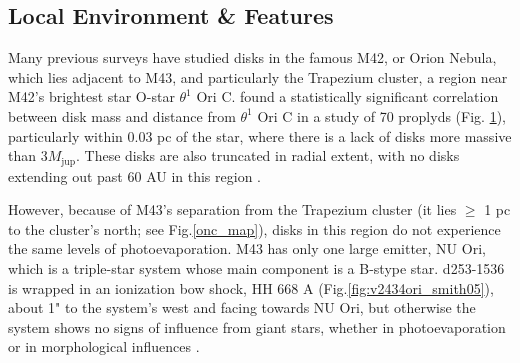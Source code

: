 \subsection{Local Environment \& Features}
Many previous surveys have studied disks in the famous M42, or Orion Nebula, which lies adjacent to M43, and particularly the Trapezium cluster, a region near M42's brightest star O-star $\theta^1$ Ori C. \citet{Mann2014} found a statistically significant correlation between disk mass and distance from $\theta^1$ Ori C in a study of 70 proplyds (Fig. \ref{fig:onc_disk_relations}), particularly within 0.03 pc of the star, where there is a lack of disks more massive than $3 M_\text{jup}$. These disks are also truncated in radial extent, with no disks extending out past 60 AU in this region \citep{Eisner2018}.


\begin{figure}[htp]
  \hspace*{\fill}%
  \hfill%
  \hspace*{\fill}%
  \label{fig:onc_disk_relations}
\end{figure}


However, because of M43's separation from the Trapezium cluster (it lies $\geq$ 1 pc to the cluster's north; see Fig.\ref{onc_map}), disks in this region do not experience the same levels of photoevaporation. M43 has only one large emitter, NU Ori, which is a triple-star system whose main component is a B-stype star. d253-1536 is wrapped in an ionization bow shock, HH 668 A (Fig.\ref{fig:v2434ori_smith05}), about 1" to the system's west and facing towards NU Ori, but otherwise the system shows no signs of influence from giant stars, whether in photoevaporation or in morphological influences \citep{MannWilliams2009}.

